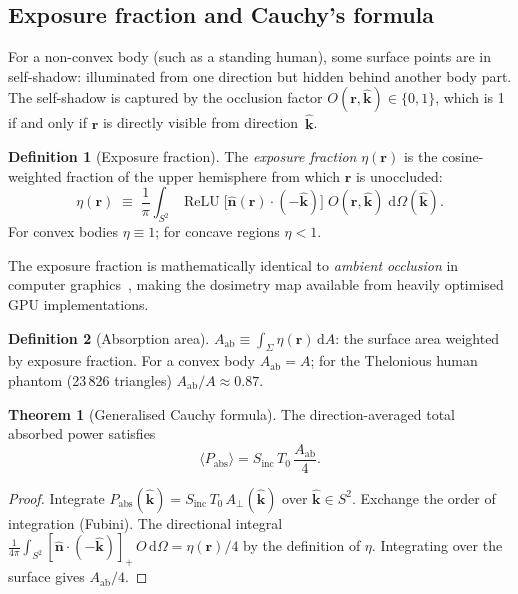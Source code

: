 \documentclass[11pt,a4paper]{article}
\theoremstyle{definition}
\newtheorem{theorem}{Theorem}[section]
\newtheorem{definition}[definition]{Definition}
\newcommand{\khat}{\hat{\bm{k}}}
\newcommand{\nhat}{\hat{\bm{n}}}
\newcommand{\rr}{\mathbf{r}}
\newcommand{\Sinc}{S_{\mathrm{inc}}}
\newcommand{\Aab}{A_{\mathrm{ab}}}
\newcommand{\Aperp}{A_{\perp}}
\DeclareMathOperator{\ReLU}{ReLU}
\newcommand{\diff}{\mathrm{d}}
\begin{document}
\subsection{Exposure fraction and Cauchy's formula}

For a non-convex body (such as a standing human), some surface points
are in self-shadow: illuminated from one direction but hidden behind
another body part.  The self-shadow is captured by the occlusion
factor $O(\rr,\khat)\in\{0,1\}$, which is 1 if and only if $\rr$ is
directly visible from direction~$\khat$.

\begin{definition}[Exposure fraction]\label{def:eta}
The \emph{exposure fraction} $\eta(\rr)$ is the cosine-weighted fraction
of the upper hemisphere from which $\rr$ is unoccluded:
\begin{equation}\label{eq:eta-def}
  \eta(\rr) \;\equiv\; \frac{1}{\pi}\int_{S^2}
  \ReLU\!\bigl[\nhat(\rr)\cdot(-\khat)\bigr]\;
  O(\rr,\khat)\;\diff\Omega(\khat).
\end{equation}
For convex bodies $\eta\equiv 1$; for concave regions $\eta<1$.
\end{definition}

The exposure fraction is mathematically identical to \emph{ambient
occlusion} in computer graphics~\cite{Zhukov1998}, making the dosimetry
map available from heavily optimised GPU implementations.

\begin{definition}[Absorption area]\label{def:Aab}
$\Aab\equiv\int_\Sigma\eta(\rr)\,\diff A$: the surface area weighted by
exposure fraction.  For a convex body $\Aab=A$; for the Thelonious
human phantom (23\,826 triangles) $\Aab/A\approx 0.87$.
\end{definition}

\begin{theorem}[Generalised Cauchy formula]\label{thm:gen-cauchy}
The direction-averaged total absorbed power satisfies
\begin{equation}\label{eq:gen-cauchy}
  \boxed{\langle P_{\mathrm{abs}}\rangle
    = \Sinc\,T_0\,\frac{\Aab}{4}.}
\end{equation}
\end{theorem}

\begin{proof}
Integrate $P_{\mathrm{abs}}(\khat)=\Sinc\,T_0\,\Aperp(\khat)$ over
$\khat\in S^2$.  Exchange the order of integration (Fubini).  The
directional integral $\frac{1}{4\pi}\int_{S^2}[\nhat\cdot(-\khat)]_+\,O\,\diff\Omega
=\eta(\rr)/4$ by the definition of $\eta$.  Integrating over the
surface gives $\Aab/4$.
\end{proof}
\end{document}
